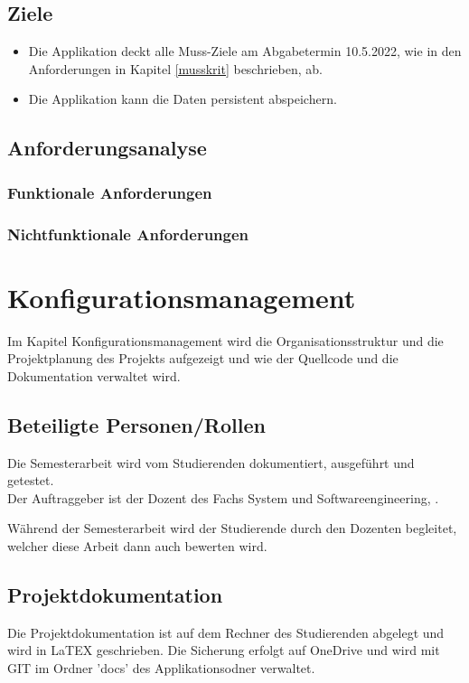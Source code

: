 \subsection{Ziele}
\begin{itemize}
  \item Die Applikation deckt alle Muss-Ziele am Abgabetermin 10.5.2022, wie in den Anforderungen in Kapitel \ref{musskrit} beschrieben, ab.
  \item Die Applikation kann die Daten persistent abspeichern.
\end{itemize}

\subsection{Anforderungsanalyse}
\subsubsection{Funktionale Anforderungen}

\subsubsection{Nichtfunktionale Anforderungen}


\section{Konfigurationsmanagement}
Im Kapitel Konfigurationsmanagement wird die Organisationsstruktur und die Projektplanung des Projekts aufgezeigt und wie der Quellcode und die Dokumentation verwaltet wird.

\subsection{Beteiligte Personen/Rollen}
Die Semesterarbeit wird vom Studierenden dokumentiert, ausgeführt und getestet.\\
Der Auftraggeber ist der Dozent des Fachs System und Softwareengineering, \gutachter.

Während der Semesterarbeit wird der Studierende durch den Dozenten \gutachter begleitet, welcher diese Arbeit dann auch bewerten wird.

\subsection{Projektdokumentation}
Die Projektdokumentation ist auf dem Rechner des Studierenden abgelegt und wird in LaTEX geschrieben. Die Sicherung erfolgt auf OneDrive und wird mit GIT im Ordner 'docs' des Applikationsodner verwaltet. 

